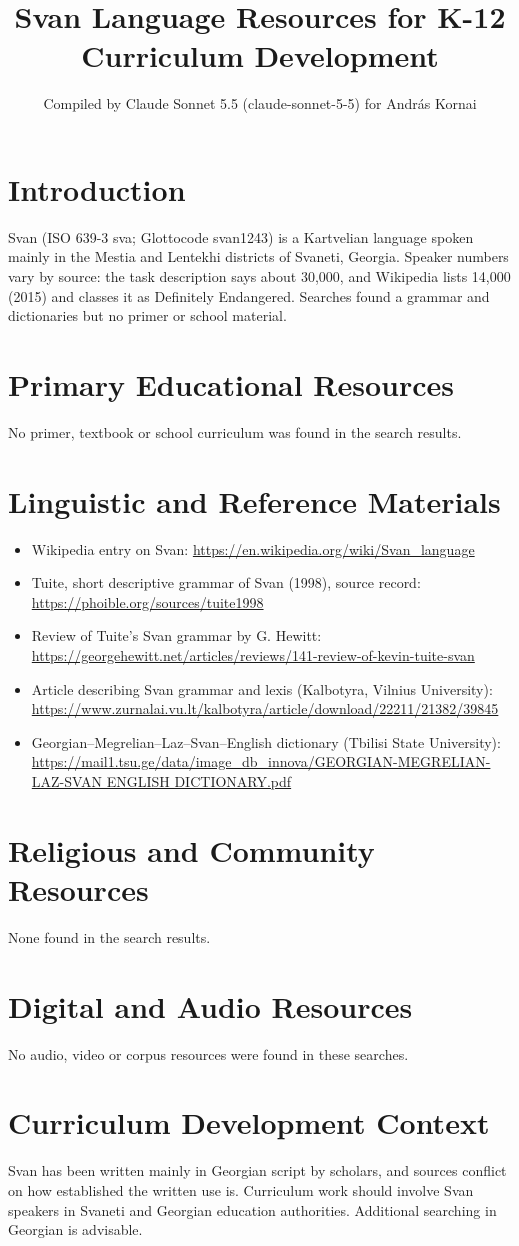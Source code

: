 \documentclass[12pt]{article}
\title{Svan Language Resources for K-12 Curriculum Development}
\author{Compiled by Claude Sonnet 5.5 (claude-sonnet-5-5) for Andr\'as Kornai}
\date{}
\begin{document}
\maketitle

\section{Introduction}
Svan (ISO 639-3 sva; Glottocode svan1243) is a Kartvelian language spoken mainly in the Mestia and Lentekhi districts of Svaneti, Georgia. Speaker numbers vary by source: the task description says about 30,000, and Wikipedia lists 14,000 (2015) and classes it as Definitely Endangered. Searches found a grammar and dictionaries but no primer or school material.

\section{Primary Educational Resources}
No primer, textbook or school curriculum was found in the search results.

\section{Linguistic and Reference Materials}
\begin{itemize}
\item Wikipedia entry on Svan: \url{https://en.wikipedia.org/wiki/Svan_language}
\item Tuite, short descriptive grammar of Svan (1998), source record: \url{https://phoible.org/sources/tuite1998}
\item Review of Tuite's Svan grammar by G. Hewitt: \url{https://georgehewitt.net/articles/reviews/141-review-of-kevin-tuite-svan}
\item Article describing Svan grammar and lexis (Kalbotyra, Vilnius University): \url{https://www.zurnalai.vu.lt/kalbotyra/article/download/22211/21382/39845}
\item Georgian--Megrelian--Laz--Svan--English dictionary (Tbilisi State University): \url{https://mail1.tsu.ge/data/image_db_innova/GEORGIAN-MEGRELIAN-LAZ-SVAN ENGLISH DICTIONARY.pdf}
\end{itemize}

\section{Religious and Community Resources}
None found in the search results.

\section{Digital and Audio Resources}
No audio, video or corpus resources were found in these searches.

\section{Curriculum Development Context}
Svan has been written mainly in Georgian script by scholars, and sources conflict on how established the written use is. Curriculum work should involve Svan speakers in Svaneti and Georgian education authorities. Additional searching in Georgian is advisable.
\end{document}
